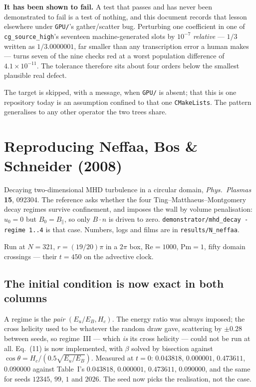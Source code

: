 \documentclass[11pt,a4paper]{article}
\newcommand{\code}[1]{\texttt{\small #1}}
\begin{document}
\textbf{It has been shown to fail.} A test that passes and has never been
demonstrated to fail is a test of nothing, and this document records that lesson
elsewhere under \code{GPU/}'s gather/scatter bug. Perturbing one coefficient in
one of \code{cg\_source\_high}'s seventeen machine-generated slots by $10^{-7}$
\emph{relative} --- $1/3$ written as $1/3.0000001$, far smaller than any
transcription error a human makes --- turns seven of the nine checks red at a
worst population difference of $4.1\times10^{-11}$. The tolerance therefore sits
about four orders below the smallest plausible real defect.

The target is skipped, with a message, when \code{GPU/} is absent; that this is
one repository today is an assumption confined to that one \code{CMakeLists}.
The pattern generalises to any other operator the two trees share.

\section{Reproducing Neffaa, Bos \& Schneider (2008)}
\label{sec:neffaa}

Decaying two-dimensional MHD turbulence in a circular domain, \emph{Phys.\
Plasmas} \textbf{15}, 092304. The reference asks whether the four
Ting--Matthaeus--Montgomery decay regimes survive confinement, and imposes the
wall by volume penalisation: $u_0=0$ but $B_0=B_\parallel$, so only $B\cdot n$ is
driven to zero. \code{demonstrator/mhd\_decay -regime 1..4} is that case.
Numbers, logs and films are in \code{results/N\_neffaa}.

Run at $N=321$, $r=(19/20)\pi$ in a $2\pi$ box, $\mathrm{Re}=1000$, $\mathrm{Pm}=1$,
fifty domain crossings --- their $t=450$ on the advective clock.

\subsection{The initial condition is now exact in both columns}

A regime is the \emph{pair} $(E_u/E_B, H_c)$. The energy ratio was always
imposed; the cross helicity used to be whatever the random draw gave, scattering
by $\pm0.28$ between seeds, so regime~III --- which \emph{is} its cross helicity
--- could not be run at all. Eq.~(11) is now implemented, with $\beta$ solved by
bisection against $\cos\theta = H_c/(0.5\sqrt{E_u/E_B})$. Measured at $t=0$:
$0.043818$, $0.000001$, $0.473611$, $0.090000$ against Table~I's $0.043818$,
$0.000001$, $0.473611$, $0.090000$, and the same for seeds $12345$, $99$, $1$ and
$2026$. The seed now picks the realisation, not the case.
\end{document}
